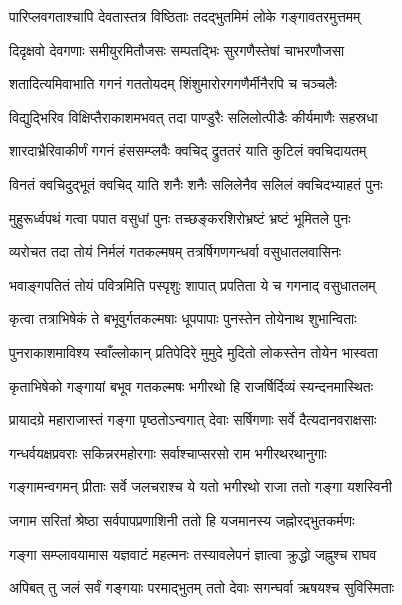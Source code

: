 \twolineshloka
{पारिप्लवगताश्चापि देवतास्तत्र विष्ठिताः}
{तदद्भुतमिमं लोके गङ्गावतरमुत्तमम्} %

\twolineshloka
{दिदृक्षवो देवगणाः समीयुरमितौजसः}
{सम्पतद्भिः सुरगणैस्तेषां चाभरणौजसा} %

\twolineshloka
{शतादित्यमिवाभाति गगनं गततोयदम्}
{शिंशुमारोरगगणैर्मीनैरपि च चञ्चलैः} %

\twolineshloka
{विद्युद्भिरिव विक्षिप्तैराकाशमभवत् तदा}
{पाण्डुरैः सलिलोत्पीडैः कीर्यमाणैः सहस्रधा} %

\twolineshloka
{शारदाभ्रैरिवाकीर्णं गगनं हंससम्प्लवैः}
{क्वचिद् द्रुततरं याति कुटिलं क्वचिदायतम्} %

\twolineshloka
{विनतं क्वचिदुद्भूतं क्वचिद् याति शनैः शनैः}
{सलिलेनैव सलिलं क्वचिदभ्याहतं पुनः} %

\twolineshloka
{मुहुरूर्ध्वपथं गत्वा पपात वसुधां पुनः}
{तच्छङ्करशिरोभ्रष्टं भ्रष्टं भूमितले पुनः} %

\twolineshloka
{व्यरोचत तदा तोयं निर्मलं गतकल्मषम्}
{तत्रर्षिगणगन्धर्वा वसुधातलवासिनः} %

\twolineshloka
{भवाङ्गपतितं तोयं पवित्रमिति पस्पृशुः}
{शापात् प्रपतिता ये च गगनाद् वसुधातलम्} %

\twolineshloka
{कृत्वा तत्राभिषेकं ते बभूवुर्गतकल्मषाः}
{धूपपापाः पुनस्तेन तोयेनाथ शुभान्विताः} %

\twolineshloka
{पुनराकाशमाविश्य स्वाँल्लोकान् प्रतिपेदिरे}
{मुमुदे मुदितो लोकस्तेन तोयेन भास्वता} %

\twolineshloka
{कृताभिषेको गङ्गायां बभूव गतकल्मषः}
{भगीरथो हि राजर्षिर्दिव्यं स्यन्दनमास्थितः} %

\twolineshloka
{प्रायादग्रे महाराजास्तं गङ्गा पृष्ठतोऽन्वगात्}
{देवाः सर्षिगणाः सर्वे दैत्यदानवराक्षसाः} %

\twolineshloka
{गन्धर्वयक्षप्रवराः सकिन्नरमहोरगाः}
{सर्वाश्चाप्सरसो राम भगीरथरथानुगाः} %

\twolineshloka
{गङ्गामन्वगमन् प्रीताः सर्वे जलचराश्च ये}
{यतो भगीरथो राजा ततो गङ्गा यशस्विनी} %

\twolineshloka
{जगाम सरितां श्रेष्ठा सर्वपापप्रणाशिनी}
{ततो हि यजमानस्य जह्नोरद्भुतकर्मणः} %

\twolineshloka
{गङ्गा सम्प्लावयामास यज्ञवाटं महत्मनः}
{तस्यावलेपनं ज्ञात्वा क्रुद्धो जह्नुश्च राघव} %

\twolineshloka
{अपिबत् तु जलं सर्वं गङ्गयाः परमाद्भुतम्}
{ततो देवाः सगन्घर्वा ऋषयश्च सुविस्मिताः} %

